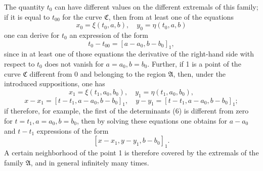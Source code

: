 \documentclass[11pt,a4paper,leqno]{article}
\begin{document}
The quantity $t_0$ can have different values on the different extremals of this family; if it is equal to $t_{00}$ for the curve $\mathfrak{C}$, then from at least one of the equations
\[
x_0=\xi(t_0,a,b),
\quad
 y_0=\eta(t_0,a,b)
\]
one can derive for $t_0$ an expression of the form
\[
t_0-t_{00}=[a-a_0,b-b_0]_1,
\]
since in at least one of those equations the derivative of the right-hand side with respect to $t_0$ does not vanish for $a=a_0,b=b_0$. Further, if 1 is a point of the curve $\mathfrak{C}$ different from 0 and belonging to the region $\mathfrak{A}$, then, under the introduced suppositions, one has
\[
x_1=\xi(t_1,a_0,b_0),
\quad
 y_1=\eta(t_1,a_0,b_0),
\]
\[
x-x_1=[t-t_1,a-a_0,b-b_0]_1,
\quad
 y-y_1=[t-t_1,a-a_0,b-b_0]_1;
\]
if therefore, for example, the first of the determinants (6) is different from zero for $t=t_1,a=a_0,b=b_0$, then by solving these equations one obtains for $a-a_0$ and $t-t_1$ expressions of the form
\[
[x-x_1,y-y_1,b-b_0]_1.
\]
A certain neighborhood of the point 1 is therefore covered by the extremals of the family $\mathfrak{A}$, and in general infinitely many times.
\end{document}

